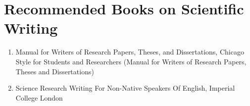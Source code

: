 \documentclass[12pt,oneside]{article}
\begin{document}
	\section{Recommended Books on Scientific Writing}
	\begin{enumerate}
		\item Manual for Writers of Research Papers, Theses, and Dissertations, Chicago Style for Students and Researchers (Manual for Writers of Research Papers, Theses and Dissertations)
		\item Science Research Writing For Non-Native Speakers Of English, Imperial College London
	\end{enumerate}
\end{document}
